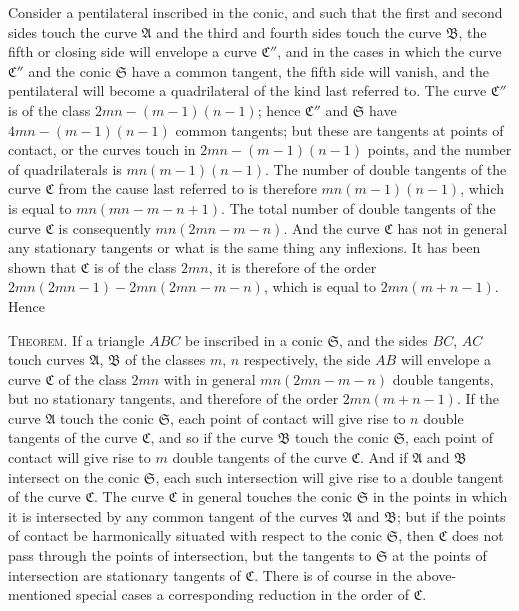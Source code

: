 \documentclass[11pt]{article}
\begin{document}
\noindent Consider a pentilateral inscribed in the conic, and such that the first and second
sides touch the curve $\mathfrak{A}$ and the third and fourth sides touch the curve $\mathfrak{B}$, the fifth
or closing side will envelope a curve $\mathfrak{C}''$, and in the cases in which the curve $\mathfrak{C}''$
and the conic $\mathfrak{S}$ have a common tangent, the fifth side will vanish, and the penti\-lateral will become a quadrilateral of the kind last referred to. The curve $\mathfrak{C}''$ is of
the class $2mn - (m - 1)(n - 1)$; hence $\mathfrak{C}''$ and $\mathfrak{S}$ have $4mn - (m - 1)(n - 1)$ common tangents;
but these are tangents at points of contact, or the curves touch in $2mn - (m - 1)(n - 1)$
points, and the number of quadrilaterals is $mn(m - 1)(n - 1)$. The number of double
tangents of the curve $\mathfrak{C}$ from the cause last referred to is therefore $mn(m - 1)(n - 1)$,
which is equal to $mn(mn - m - n + 1)$. The total number of double tangents of the
curve $\mathfrak{C}$ is consequently $mn(2mn - m - n)$. And the curve $\mathfrak{C}$ has not in general any
stationary tangents or what is the same thing any inflexions. It has been shown that
$\mathfrak{C}$ is of the class $2mn$, it is therefore of the order $2mn(2mn - 1) - 2mn(2mn - m - n)$,
which is equal to $2mn(m + n - 1)$. Hence

\textsc{Theorem.} If a triangle $ABC$ be inscribed in a conic $\mathfrak{S}$, and the sides $BC$, $AC$
touch curves $\mathfrak{A}$, $\mathfrak{B}$ of the classes $m$, $n$ respectively, the side $AB$ will envelope a
curve $\mathfrak{C}$ of the class $2mn$ with in general $mn(2mn - m - n)$ double tangents, but no
stationary tangents, and therefore of the order $2mn(m + n - 1)$. If the curve $\mathfrak{A}$ touch
the conic $\mathfrak{S}$, each point of contact will give rise to $n$ double tangents of the curve
$\mathfrak{C}$, and so if the curve $\mathfrak{B}$ touch the conic $\mathfrak{S}$, each point of contact will give rise to
$m$ double tangents of the curve $\mathfrak{C}$. And if $\mathfrak{A}$ and $\mathfrak{B}$ intersect on the conic $\mathfrak{S}$, each
such intersection will give rise to a double tangent of the curve $\mathfrak{C}$. The curve $\mathfrak{C}$
in general touches the conic $\mathfrak{S}$ in the points in which it is intersected by any
common tangent of the curves $\mathfrak{A}$ and $\mathfrak{B}$; but if the points of contact be harmonically
situated with respect to the conic $\mathfrak{S}$, then $\mathfrak{C}$ does not pass through the points of
intersection, but the tangents to $\mathfrak{S}$ at the points of intersection are stationary tangents
of $\mathfrak{C}$. There is of course in the above-mentioned special cases a corresponding re\-duction in the order of $\mathfrak{C}$.
\end{document}
